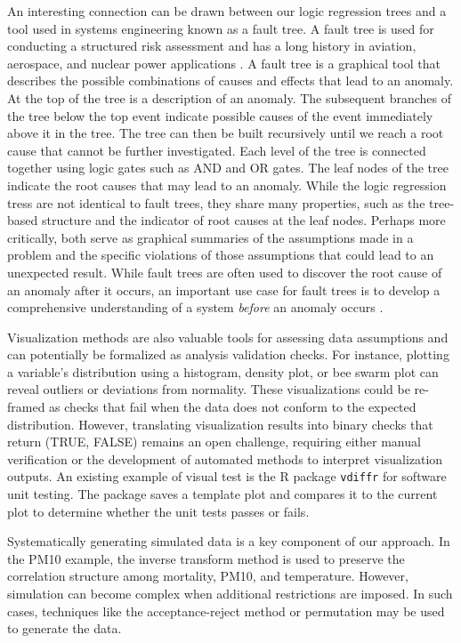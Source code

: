 \documentclass[
  12pt,
]{interact}
\begin{document}
An interesting connection can be drawn between our logic regression
trees and a tool used in systems engineering known as a fault tree. A
fault tree is used for conducting a structured risk assessment and has a
long history in aviation, aerospace, and nuclear power applications
\citep{vesely1981fault}. A fault tree is a graphical tool that describes
the possible combinations of causes and effects that lead to an anomaly.
At the top of the tree is a description of an anomaly. The subsequent
branches of the tree below the top event indicate possible causes of the
event immediately above it in the tree. The tree can then be built
recursively until we reach a root cause that cannot be further
investigated. Each level of the tree is connected together using logic
gates such as AND and OR gates. The leaf nodes of the tree indicate the
root causes that may lead to an anomaly. While the logic regression
tress are not identical to fault trees, they share many properties, such
as the tree-based structure and the indicator of root causes at the leaf
nodes. Perhaps more critically, both serve as graphical summaries of the
assumptions made in a problem and the specific violations of those
assumptions that could lead to an unexpected result. While fault trees
are often used to discover the root cause of an anomaly after it occurs,
an important use case for fault trees is to develop a comprehensive
understanding of a system \emph{before} an anomaly occurs
\citep{michael2002fault}.

Visualization methods are also valuable tools for assessing data
assumptions and can potentially be formalized as analysis validation
checks. For instance, plotting a variable's distribution using a
histogram, density plot, or bee swarm plot can reveal outliers or
deviations from normality. These visualizations could be re-framed as
checks that fail when the data does not conform to the expected
distribution. However, translating visualization results into binary
checks that return (TRUE, FALSE) remains an open challenge, requiring
either manual verification or the development of automated methods to
interpret visualization outputs. An existing example of visual test is
the R package \texttt{vdiffr} \citep{vdiffr} for software unit testing.
The package saves a template plot and compares it to the current plot to
determine whether the unit tests passes or fails.

Systematically generating simulated data is a key component of our
approach. In the PM10 example, the inverse transform method is used to
preserve the correlation structure among mortality, PM10, and
temperature. However, simulation can become complex when additional
restrictions are imposed. In such cases, techniques like the
acceptance-reject method or permutation may be used to generate the
data.
\end{document}
